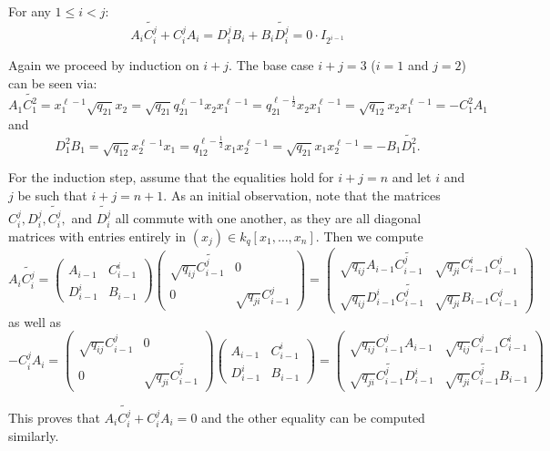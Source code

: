\documentclass [11pt, proquest] {uwthesis}[2020/02/24]
\begin{document}
    \begin{lem}\label{lem:zero-matrix}
            For any $1\le i<j$:
            \[A_i\widetilde{C_i^j}+C_i^jA_{i} = D_i^jB_{i}+B_{i}\widetilde{D_i^j}=0\cdot I_{2^{i-1}}\]
    \end{lem}
    \begin{prf}
        Again we proceed by induction on $i+j.$ The base case $i+j=3$ ($i=1$ and $j=2$) can be seen via:
        \[A_1\widetilde{C_1^2}=x_1^{\ell -1}\sqrt{q_{21}}x_2=\sqrt{q_{21}}q_{21}^{\ell -1}x_2x_1^{\ell -1}=q_{21}^{\ell -\frac{1}{2}}x_2x_1^{\ell -1}=\sqrt{q_{12}}x_2x_1^{\ell -1}=-C_1^2 A_1\]
        and
        \[D_1^2B_1=\sqrt{q_{12}}x_2^{\ell -1}x_1=q_{12}^{\ell -\frac{1}{2}}x_1x_2^{\ell -1}=\sqrt{q_{21}}x_1x_2^{\ell -1}=-B_1\widetilde{D_1^2}.\]
        
        For the induction step, assume that the equalities hold for $i+j=n$ and let $i$ and $j$ be such that $i+j=n+1$. As an initial observation, note that the matrices $C_i^j, D_i^j, \widetilde{C_i^j},$ and $\widetilde{D_i^j}$ all commute with one another, as they are all diagonal matrices with entries entirely in $(x_j)\in k_q[x_1,\dots, x_n].$ Then we compute
        \[
            A_i\widetilde{C_i^j} =\begin{pmatrix}
                A_{i-1} & C_{i-1}^i\\ D_{i-1}^i & B_{i-1}
            \end{pmatrix}\begin{pmatrix}
                \sqrt{q_{ij}}\widetilde{C_{i-1}^j} & 0\\ 0 & \sqrt{q_{ji}}C_{i-1}^j
            \end{pmatrix}=\begin{pmatrix}
                \sqrt{q_{ij}}A_{i-1}\widetilde{C_{i-1}^j} & \sqrt{q_{ji}}C_{i-1}^iC_{i-1}^j\\
                \sqrt{q_{ij}}D_{i-1}^i\widetilde{C_{i-1}^j} & \sqrt{q_{ji}}B_{i-1}C_{i-1}^j
            \end{pmatrix}
        \]
        as well as
        \[-C_i^jA_i = \begin{pmatrix}
                \sqrt{q_{ij}}C_{i-1}^j & 0\\ 0 & \sqrt{q_{ji}}\widetilde{C_{i-1}^j}
            \end{pmatrix}\begin{pmatrix}
                A_{i-1} & C_{i-1}^i\\ D_{i-1}^i & B_{i-1}
            \end{pmatrix}=\begin{pmatrix}
                \sqrt{q_{ij}}C_{i-1}^jA_{i-1} & \sqrt{q_{ij}}C_{i-1}^jC_{i-1}^i\\
                \sqrt{q_{ji}}\widetilde{C_{i-1}^j}D_{i-1}^i & \sqrt{q_{ji}}\widetilde{C_{i-1}^j}B_{i-1}
            \end{pmatrix}\]
        
        This proves that $A_i\widetilde{C_i^j}+C_i^jA_i=0$ and the other equality can be computed similarly.
    \end{prf}
    
\end{document}

